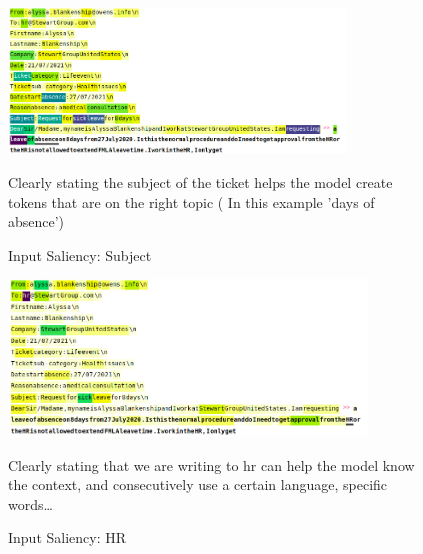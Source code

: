 \begin{figure}[h!] 
    \includegraphics[width=0.8\textwidth]{images/Screenshot from 2022-11-26 18-18-28}
    \caption{Input Saliency: Subject}
    \medskip
    \footnotesize	
    Clearly stating the subject of the ticket helps the model create tokens that are on the right topic ( In this example 'days of absence')
    \label{fig:topic}
\end{figure}    

\begin{figure}[h!] 
    \includegraphics[width=0.85\textwidth]{images/Screenshot from 2022-11-26 18-18-40.png}
    \caption{Input Saliency: HR}
    \medskip
    \footnotesize
    Clearly stating that we are writing to hr can help the model know the context, and consecutively use a certain language, specific words\dots
    \label{fig:hr}
\end{figure}    


